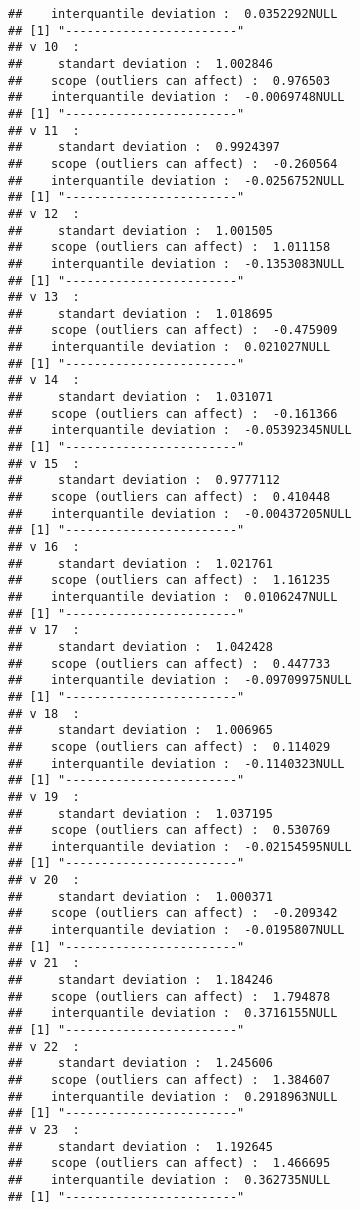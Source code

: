 \documentclass[]{article}
\begin{document}
\begin{verbatim}
##    interquantile deviation :  0.0352292NULL
## [1] "------------------------"
## v 10  : 
##     standart deviation :  1.002846 
##    scope (outliers can affect) :  0.976503 
##    interquantile deviation :  -0.0069748NULL
## [1] "------------------------"
## v 11  : 
##     standart deviation :  0.9924397 
##    scope (outliers can affect) :  -0.260564 
##    interquantile deviation :  -0.0256752NULL
## [1] "------------------------"
## v 12  : 
##     standart deviation :  1.001505 
##    scope (outliers can affect) :  1.011158 
##    interquantile deviation :  -0.1353083NULL
## [1] "------------------------"
## v 13  : 
##     standart deviation :  1.018695 
##    scope (outliers can affect) :  -0.475909 
##    interquantile deviation :  0.021027NULL
## [1] "------------------------"
## v 14  : 
##     standart deviation :  1.031071 
##    scope (outliers can affect) :  -0.161366 
##    interquantile deviation :  -0.05392345NULL
## [1] "------------------------"
## v 15  : 
##     standart deviation :  0.9777112 
##    scope (outliers can affect) :  0.410448 
##    interquantile deviation :  -0.00437205NULL
## [1] "------------------------"
## v 16  : 
##     standart deviation :  1.021761 
##    scope (outliers can affect) :  1.161235 
##    interquantile deviation :  0.0106247NULL
## [1] "------------------------"
## v 17  : 
##     standart deviation :  1.042428 
##    scope (outliers can affect) :  0.447733 
##    interquantile deviation :  -0.09709975NULL
## [1] "------------------------"
## v 18  : 
##     standart deviation :  1.006965 
##    scope (outliers can affect) :  0.114029 
##    interquantile deviation :  -0.1140323NULL
## [1] "------------------------"
## v 19  : 
##     standart deviation :  1.037195 
##    scope (outliers can affect) :  0.530769 
##    interquantile deviation :  -0.02154595NULL
## [1] "------------------------"
## v 20  : 
##     standart deviation :  1.000371 
##    scope (outliers can affect) :  -0.209342 
##    interquantile deviation :  -0.0195807NULL
## [1] "------------------------"
## v 21  : 
##     standart deviation :  1.184246 
##    scope (outliers can affect) :  1.794878 
##    interquantile deviation :  0.3716155NULL
## [1] "------------------------"
## v 22  : 
##     standart deviation :  1.245606 
##    scope (outliers can affect) :  1.384607 
##    interquantile deviation :  0.2918963NULL
## [1] "------------------------"
## v 23  : 
##     standart deviation :  1.192645 
##    scope (outliers can affect) :  1.466695 
##    interquantile deviation :  0.362735NULL
## [1] "------------------------"

\end{verbatim}
\end{document}
